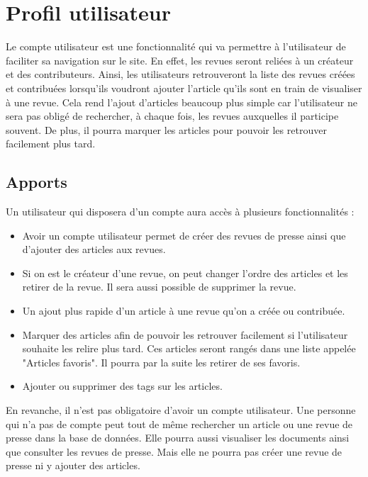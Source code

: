\section{Profil utilisateur}
\label{sec:profil}

Le compte utilisateur est une fonctionnalité qui va permettre à l'utilisateur de faciliter sa navigation sur le site. En effet, les revues seront reliées à un créateur et des contributeurs. Ainsi, les utilisateurs retrouveront la liste des revues créées et contribuées lorsqu'ils voudront ajouter l'article qu'ils sont en train de visualiser à une revue. Cela rend l'ajout d'articles beaucoup plus simple car l'utilisateur ne sera pas obligé de rechercher, à chaque fois, les revues auxquelles il participe souvent. De plus, il pourra marquer les articles pour pouvoir les retrouver facilement plus tard.

\subsection{Apports}
\label{apport}
 

Un utilisateur qui disposera d'un compte aura accès à plusieurs fonctionnalités :

\begin{itemize}
  \item Avoir un compte utilisateur permet de créer des revues de presse ainsi que d'ajouter des articles aux revues.
	\item Si on est le créateur d'une revue, on peut changer l'ordre des articles et les retirer de la revue. Il sera aussi possible de supprimer la revue.
  \item Un ajout plus rapide d'un article à une revue qu'on a créée ou contribuée.
  \item Marquer des articles afin de pouvoir les retrouver facilement si l'utilisateur souhaite les relire plus tard. Ces articles seront rangés dans une liste appelée "Articles favoris". Il pourra par la suite les retirer de ses favoris.
	\item Ajouter ou supprimer des tags sur les articles.
\end{itemize}

En revanche, il n'est pas obligatoire d'avoir un compte utilisateur. Une personne qui n'a pas de compte peut tout de même rechercher un article ou une revue de presse dans la base de données. Elle pourra aussi visualiser les documents ainsi que consulter les revues de presse. Mais elle ne pourra pas créer une revue de presse ni y ajouter des articles.


